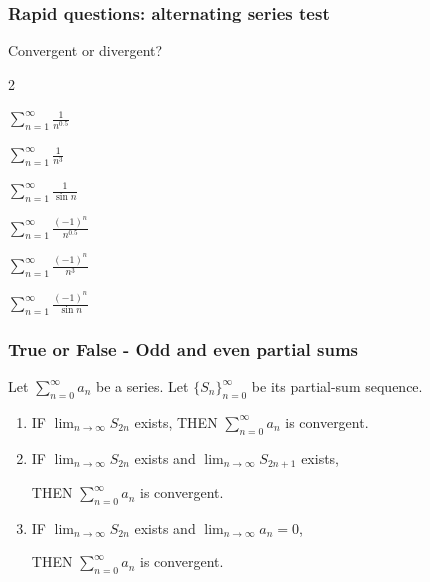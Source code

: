 \begin{frame}[t]
	\frametitle{Rapid questions: alternating series test}

	Convergent or divergent?

	\begin{enumerate}
	\end{enumerate}
\end{frame}

\begin{frame}[t]
	\fontsize{12}{12}\selectfont
	\frametitle{True or False - Odd and even partial sums}

	Let $\displaystyle \sum_{n=0}^{\infty}a_{n}$ be a series. Let
	$\displaystyle \{ S_{n}\}_{n=0}^{\infty}$ be its partial-sum sequence.

	\begin{enumerate}
		\item IF $\displaystyle \lim_{n \to \infty}S_{2n}$ exists, \quad THEN \;
			{\color{blue} $\displaystyle \sum_{n=0}^{\infty}a_{n}$ is convergent}.
			\vspace{.5cm}

		\item IF $\displaystyle \lim_{n \to \infty}S_{2n}$ exists \; and \; $\displaystyle
			\lim_{n \to \infty}S_{2n+1}$ exists,

			THEN \; {\color{blue} $\displaystyle \sum_{n=0}^{\infty}a_{n}$ is convergent}.
			\vspace{.5cm}

		\item IF $\displaystyle \lim_{n \to \infty}S_{2n}$ exists \; and \; $\displaystyle
			\lim_{n \to \infty}a_{n}= 0$,

			THEN \; {\color{blue} $\displaystyle \sum_{n=0}^{\infty}a_{n}$ is convergent}.
	\end{enumerate}
\end{frame}


